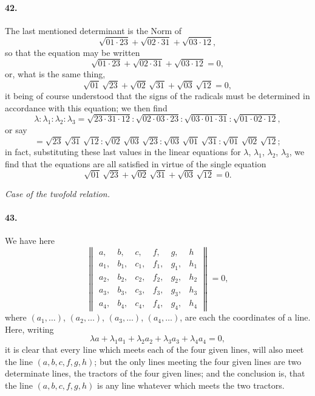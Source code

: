 \documentclass[11pt,a4paper]{article}
\begin{document}
\paragraph{42.}
The last mentioned determinant is the Norm of
\[
\sqrt{01\cdot 23} + \sqrt{02\cdot 31} + \sqrt{03\cdot 12},
\]
so that the equation may be written
\[
\sqrt{01\cdot 23} + \sqrt{02\cdot 31} + \sqrt{03\cdot 12} = 0,
\]
or, what is the same thing,
\[
\sqrt{01}\,\sqrt{23} + \sqrt{02}\,\sqrt{31} + \sqrt{03}\,\sqrt{12} = 0,
\]
it being of course understood that the signs of the radicals must be determined in
accordance with this equation; we then find
\[
\lambda : \lambda_1 : \lambda_2 : \lambda_3
 = \sqrt{23\cdot 31\cdot 12} : \sqrt{02\cdot 03\cdot 23}
 : \sqrt{03\cdot 01\cdot 31} : \sqrt{01\cdot 02\cdot 12},
\]
or say
\[
= \sqrt{23}\,\sqrt{31}\,\sqrt{12}
 : \sqrt{02}\,\sqrt{03}\,\sqrt{23}
 : \sqrt{03}\,\sqrt{01}\,\sqrt{31}
 : \sqrt{01}\,\sqrt{02}\,\sqrt{12};
\]
in fact, substituting these last values in the linear equations for $\lambda$, $\lambda_1$,
$\lambda_2$, $\lambda_3$, we find that the equations are all satisfied in virtue of the single equation
\[
\sqrt{01}\,\sqrt{23} + \sqrt{02}\,\sqrt{31} + \sqrt{03}\,\sqrt{12} = 0.
\]

\bigskip
\begin{center}
\textit{Case of the twofold relation.}
\end{center}

\paragraph{43.}
We have here
\[
\begin{Vmatrix}
a, & b, & c, & f, & g, & h \\
a_1, & b_1, & c_1, & f_1, & g_1, & h_1 \\
a_2, & b_2, & c_2, & f_2, & g_2, & h_2 \\
a_3, & b_3, & c_3, & f_3, & g_3, & h_3 \\
a_4, & b_4, & c_4, & f_4, & g_4, & h_4
\end{Vmatrix} = 0,
\]
where $(a_1, \ldots)$, $(a_2, \ldots)$, $(a_3, \ldots)$, $(a_4, \ldots)$, are each the coordinates of a
line. Here, writing
\[
\lambda a + \lambda_1 a_1 + \lambda_2 a_2 + \lambda_3 a_3 + \lambda_4 a_4 = 0,
\]
it is clear that every line which meets each of the four given lines, will also meet the
line $(a,b,c,f,g,h)$; but the only lines meeting the four given lines are two
determinate lines, the tractors of the four given lines; and the conclusion is, that the
line $(a,b,c,f,g,h)$ is any line whatever which meets the two tractors.
\end{document}
